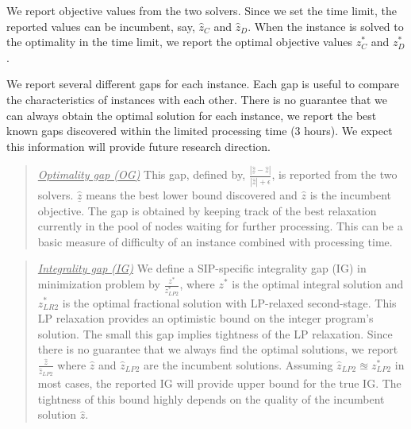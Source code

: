 We report objective values from the two solvers. Since we set the time limit, the reported values can be incumbent, say, $\hat{z}_C$ and $\hat{z}_D$. When the instance is solved to the optimality in the time limit, we report the optimal objective values $z^*_C$ and $z^*_D$.

We report several different gaps for each instance. Each gap is useful to compare the characteristics of instances with each other. There is no guarantee that we can always obtain the optimal solution for each instance, we report the best known gaps discovered within the limited processing time (3 hours). We expect this information will provide future research direction. 


\begin{quote}
\noindent\underline{\textit{Optimality gap (OG)}} This gap, defined by, $\frac{|\underline{\hat{z}}-\hat{z}|}{|\hat{z}|+\epsilon}$, is reported from the two solvers. $\underline{\hat{z}}$ means the best lower bound discovered and $\hat{z}$ is the incumbent objective. The gap is obtained by keeping track of the best relaxation currently in the pool of nodes waiting for further processing. This can be a basic measure of difficulty of an instance combined with processing time.
\end{quote}

\begin{quote}
\noindent\underline{\textit{Integrality gap (IG)}} We define a SIP-specific integrality gap (IG) in minimization problem by $\frac{z^*}{z^*_{LP2}}$, where $z^*$ is the optimal integral solution and $z^*_{LR2}$ is the optimal fractional solution with LP-relaxed second-stage. This LP relaxation provides an optimistic bound on the integer program's solution. The small this gap implies tightness of the LP relaxation. Since there is no guarantee that we always find the optimal solutions, we report $\frac{\hat{z}}{\hat{z}_{LP2}}$ where $\hat{z}$ and $\hat{z}_{LP2}$ are the incumbent solutions. Assuming $\hat{z}_{LP2}\approxeq z^*_{LP2}$ in most cases, the reported IG will provide upper bound for the true IG. The tightness of this bound highly depends on the quality of the incumbent solution $\hat{z}$.%
\end{quote}

